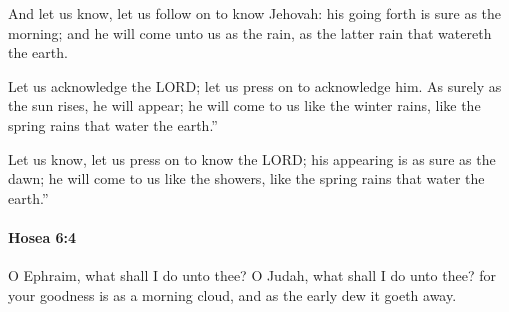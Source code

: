 			\begin{versebox}
					\item[BHS] 
					\item[LXX] 
					\item[ASV] And let us know, let us follow on to know Jehovah: his going forth is sure as the morning; and he will come unto us as the rain, as the latter rain that watereth the earth.
					\item[NIV] Let us acknowledge the LORD; let us press on to acknowledge him. As surely as the sun rises, he will appear; he will come to us like the winter rains, like the spring rains that water the earth.”
					\item[NRSV] Let us know, let us press on to know the LORD; his appearing is as sure as the dawn; he will come to us like the showers, like the spring rains that water the earth.”
			\end{versebox}

		\paragraph{Hosea 6:4} %
			\label{HOSEA-6-4}

			O Ephraim, what shall I do unto thee? O Judah, what shall I do unto thee? for your goodness is as a morning cloud, and as the early dew it goeth away.

